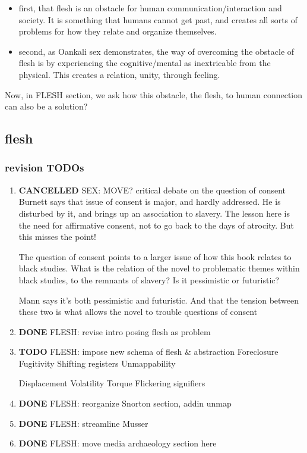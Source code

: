 \documentclass[11pt]{article}
\begin{document}
\begin{enumerate}
\begin{itemize}
\item first, that flesh is an obstacle for human communication/interaction
and society. It is something that humans cannot get past, and
creates all sorts of problems for how they relate and organize
themselves.
\item second, as Oankali sex demonstrates, the way of overcoming the
obstacle of flesh is by experiencing the cognitive/mental as
inextricable from the physical. This creates a relation, unity,
through feeling.
\end{itemize}

Now, in FLESH section, we ask how this obstacle, the flesh, to human
connection can also be a solution?
\end{enumerate}


\subsection{flesh}
\label{sec:org8da9cdd}
\subsubsection{revision TODOs}
\label{sec:orgaa99446}
\begin{enumerate}
\item {\bfseries\sffamily CANCELLED} SEX: MOVE? critical debate on the question of consent
\label{sec:orgc1ecc84}
Burnett says that issue of consent is major, and hardly addressed. He
is disturbed by it, and brings up an association to slavery. The
lesson here is the need for affirmative consent, not to go back to the
days of atrocity. But this misses the point!

The question of consent points to a larger issue of how this book
relates to black studies. What is the relation of the novel to
problematic themes within black studies, to the remnants of slavery?
Is it pessimistic or futuristic?

Mann says it's both pessimistic and futuristic. And that the tension
between these two is what allows the novel to trouble questions of
consent

\item {\bfseries\sffamily DONE} FLESH: revise intro posing flesh as problem
\label{sec:orgd2a7a17}

\item {\bfseries\sffamily TODO} FLESH: impose new schema of flesh \& abstraction
\label{sec:orga3884df}
Foreclosure
Fugitivity
Shifting registers
Unmappability

Displacement
Volatility
Torque
Flickering signifiers

\item {\bfseries\sffamily DONE} FLESH: reorganize Snorton section, addin unmap
\label{sec:orga097f13}
\item {\bfseries\sffamily DONE} FLESH: streamline Musser
\label{sec:org48b612b}
\item {\bfseries\sffamily DONE} FLESH: move media archaeology section here
\label{sec:orgf77760d}
\end{enumerate}
\end{document}
